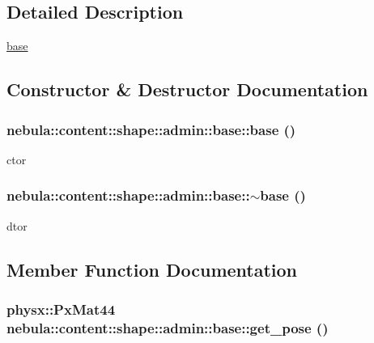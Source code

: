 \subsection{Detailed Description}
\hyperlink{classnebula_1_1content_1_1shape_1_1admin_1_1base}{base} 

\subsection{Constructor \& Destructor Documentation}
\hypertarget{classnebula_1_1content_1_1shape_1_1admin_1_1base_a78f56855e39ede34e4246147913b102a}{
\subsubsection[{base}]{\setlength{\rightskip}{0pt plus 5cm}nebula::content::shape::admin::base::base ()}}
\label{classnebula_1_1content_1_1shape_1_1admin_1_1base_a78f56855e39ede34e4246147913b102a}


ctor \hypertarget{classnebula_1_1content_1_1shape_1_1admin_1_1base_a74497ec45a44461ce4eca4dc2be477f9}{
\subsubsection[{$\sim$base}]{\setlength{\rightskip}{0pt plus 5cm}nebula::content::shape::admin::base::$\sim$base ()}}
\label{classnebula_1_1content_1_1shape_1_1admin_1_1base_a74497ec45a44461ce4eca4dc2be477f9}


dtor 

\subsection{Member Function Documentation}
\hypertarget{classnebula_1_1content_1_1shape_1_1admin_1_1base_a140ebc628fcc1ccad7363c866fbd6a4c}{
\subsubsection[{get\_\-pose}]{\setlength{\rightskip}{0pt plus 5cm}physx::PxMat44 nebula::content::shape::admin::base::get\_\-pose ()}}
\label{classnebula_1_1content_1_1shape_1_1admin_1_1base_a140ebc628fcc1ccad7363c866fbd6a4c}



